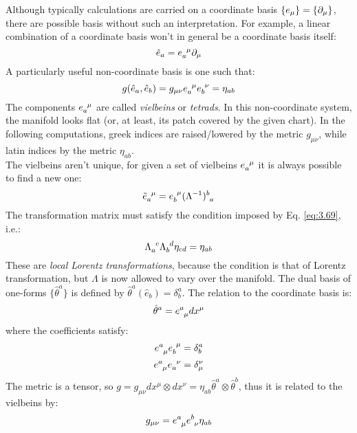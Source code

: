 Although typically calculations are carried on a coordinate basis $ \{e_\mu\} = \{\partial_\mu\} $, there are possible basis without such an interpretation. For example, a linear combination of a coordinate basis won't in general be a coordinate basis itself:
\begin{equation}
  \hat{e}_a = \tensor{e}{_a^\mu} \pa_\mu
  \label{eq:3.68}
\end{equation}
A particularly useful non-coordinate basis is one such that:
\begin{equation}
  g(\hat{e}_a, \hat{e}_b) = g_{\mu \nu} \tensor{e}{_a^\mu} \tensor{e}{_b^\nu} = \eta_{ab}
  \label{eq:3.69}
\end{equation}
The components $ \tensor{e}{_a^\mu} $ are called \textit{vielbeins} or \textit{tetrads}. In this non-coordinate system, the manifold looks flat (or, at least, its patch covered by the given chart). In the following computations, greek indices are raised/lowered by the metric $ g_{\mu \nu} $, while latin indices by the metric $ \eta_{ab} $.\\
The vielbeins aren't unique, for given a set of vielbeins $ \tensor{e}{_a^\mu} $ it is always possible to find a new one:
\begin{equation}
  \tensor{\tilde{e}}{_a^\mu} = \tensor{e}{_b^\mu} \tensor{(\Lambda^{-1})}{^b_a}
  \label{eq:3.70}
\end{equation}
The transformation matrix must satisfy the condition imposed by Eq. \ref{eq:3.69}, i.e.:
\begin{equation}
  \tensor{\Lambda}{_a^c} \tensor{\Lambda}{_b^d} \eta_{cd} = \eta_{ab}
  \label{eq:3.71}
\end{equation}
These are \textit{local Lorentz transformations}, because the condition is that of Lorentz transformation, but $ \Lambda $ is now allowed to vary over the manifold. The dual basis of one-forms $ \{\hat{\theta}^a\} $ is defined by $ \hat{\theta}^a(\hat{e}_b) = \delta^a_b $. The relation to the coordinate basis is:
\begin{equation}
  \hat{\theta}^a = \tensor{e}{^a_\mu} dx^\mu
  \label{eq:3.72}
\end{equation}
where the coefficients satisfy:
\begin{equation}
  \tensor{e}{^a_\mu} \tensor{e}{_b^\mu} = \delta^a_b
  \label{eq:3.73}
\end{equation}
\begin{equation}
  \tensor{e}{^a_\mu} \tensor{e}{_a^\nu} = \delta_\mu^\nu
  \label{eq:3.74}
\end{equation}
The metric is a tensor, so $ g = g_{\mu \nu} dx^\mu \otimes dx^\nu = \eta_{ab} \hat{\theta}^a \otimes \hat{\theta}^b $, thus it is related to the vielbeins by:
\begin{equation}
  g_{\mu \nu} = \tensor{e}{^a_\mu} \tensor{e}{^b_\nu} \eta_{ab}
  \label{eq:3.75}
\end{equation}

